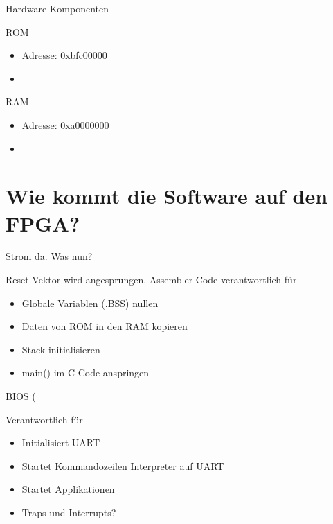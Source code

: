 \begin{frame}{Hardware-Komponenten}
\begin{frame}{ROM}
\begin{itemize}
	\item Adresse: 0xbfc00000
	\item 
\end{itemize}
\begin{center}
\end{center}

\end{frame}

\begin{frame}{RAM}
\begin{itemize}
	\item Adresse: 0xa0000000
	\item 
\end{itemize}
\end{frame}


\section{Wie kommt die Software auf den FPGA?}

\begin{frame}{Strom da. Was nun?}

Reset Vektor wird angesprungen. Assembler Code verantwortlich für

\begin{itemize}
\item Globale Variablen (.BSS) nullen
\item Daten von ROM in den RAM kopieren
\item Stack initialisieren
\item main() im C Code anspringen
\end{itemize}

\end{frame}

\begin{frame}{BIOS (}

Verantwortlich für

\begin{itemize}
\item Initialisiert UART
\item Startet Kommandozeilen Interpreter auf UART
\item Startet Applikationen
\item Traps und Interrupts?
\pause
\end{itemize}

\end{frame}


\end{frame}

